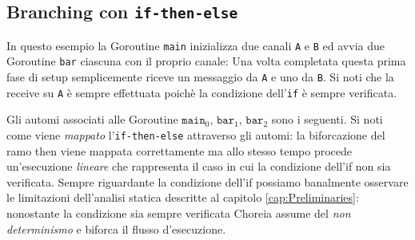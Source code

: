 \subsection{Branching con \texttt{if-then-else}}
In questo esempio la Goroutine \texttt{main} inizializza due canali \texttt{A} e \texttt{B} ed avvia due Goroutine \texttt{bar} ciascuna con il proprio canale: Una volta completata questa prima fase di setup semplicemente riceve un messaggio da \texttt{A} e uno da \texttt{B}. Si noti che la receive su \texttt{A} è sempre effettuata poichè la condizione dell'\texttt{if} è sempre verificata.

Gli automi associati alle Goroutine $\texttt{main}_0$, $\texttt{bar}_1$, $\texttt{bar}_2$ sono i seguenti. Si noti come viene \emph{mappato} l'\texttt{if-then-else} attraverso gli automi: la biforcazione del ramo then viene mappata correttamente ma allo stesso tempo procede un'esecuzione \emph{lineare} che rappresenta il caso in cui la condizione dell'if non sia verificata. Sempre riguardante la condizione dell'if possiamo banalmente osservare le limitazioni dell'analisi statica descritte al capitolo \ref{cap:Preliminaries}: nonostante la condizione sia sempre verificata Choreia assume del \emph{non determinismo} e biforca il flusso d'esecuzione.
\newpage %
\begin{figure}[t!]
    \centering
\end{figure}
